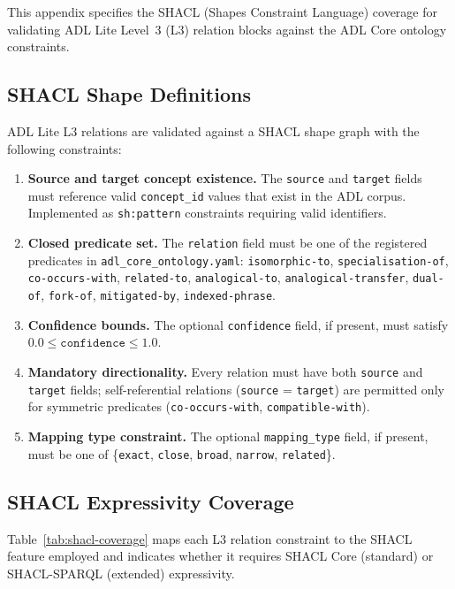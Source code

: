 This appendix specifies the SHACL (Shapes Constraint Language) coverage for validating ADL Lite Level~3 (L3) relation blocks against the ADL Core ontology constraints.

\subsection{SHACL Shape Definitions}

ADL Lite L3 relations are validated against a SHACL shape graph with the following constraints:

\begin{enumerate}[label=\textbf{S\arabic*}, leftmargin=3em]
    \item \textbf{Source and target concept existence.} The \texttt{source} and \texttt{target} fields must reference valid \texttt{concept\_id} values that exist in the ADL corpus. Implemented as \texttt{sh:pattern} constraints requiring valid identifiers.
    \item \textbf{Closed predicate set.} The \texttt{relation} field must be one of the registered predicates in \texttt{adl\_core\_ontology.yaml}: \texttt{isomorphic-to}, \texttt{specialisation-of}, \texttt{co-occurs-with}, \texttt{related-to}, \texttt{analogical-to}, \texttt{analogical-transfer}, \texttt{dual-of}, \texttt{fork-of}, \texttt{mitigated-by}, \texttt{indexed-phrase}.
    \item \textbf{Confidence bounds.} The optional \texttt{confidence} field, if present, must satisfy $0.0 \leq \texttt{confidence} \leq 1.0$.
    \item \textbf{Mandatory directionality.} Every relation must have both \texttt{source} and \texttt{target} fields; self-referential relations (\texttt{source} = \texttt{target}) are permitted only for symmetric predicates (\texttt{co-occurs-with}, \texttt{compatible-with}).
    \item \textbf{Mapping type constraint.} The optional \texttt{mapping\_type} field, if present, must be one of \{\texttt{exact}, \texttt{close}, \texttt{broad}, \texttt{narrow}, \texttt{related}\}.
\end{enumerate}

\subsection{SHACL Expressivity Coverage}

Table~\ref{tab:shacl-coverage} maps each L3 relation constraint to the SHACL feature employed and indicates whether it requires SHACL Core (standard) or SHACL-SPARQL (extended) expressivity.


